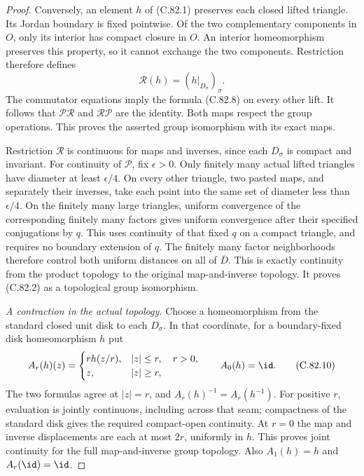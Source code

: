 \begin{proof}
Conversely, an element $h$ of (C.82.1)
preserves each closed lifted triangle.
Its Jordan boundary is fixed pointwise.
Of the two complementary components
in $O$, only its interior has compact
closure in $O$. An interior homeomorphism
preserves this property, so it cannot
exchange the two components. Restriction
therefore defines
\[
 \mathcal R(h)=(h|_{D_\sigma})_\sigma.
                                                               \tag{C.82.9}
\]
The commutator equations imply the
formula (C.82.8) on every other lift.
It follows that $\mathcal P\mathcal R$
and $\mathcal R\mathcal P$ are the
identity. Both maps respect the group
operations. This proves the asserted
group isomorphism with its exact maps.

Restriction $\mathcal R$ is continuous
for maps and inverses, since each
$D_\sigma$ is compact and invariant.
For continuity of $\mathcal P$, fix
$\epsilon>0$. Only finitely many actual
lifted triangles have diameter at least
$\epsilon/4$. On every other triangle,
two pasted maps, and separately their
inverses, take each point into the same
set of diameter less than $\epsilon/4$.
On the finitely many large triangles,
uniform convergence of the corresponding
finitely many factors gives uniform
convergence after their specified
conjugations by $q$. This uses continuity
of that fixed $q$ on a compact triangle,
and requires no boundary extension of
$q$. The finitely many factor neighborhoods
therefore control both uniform distances
on all of $\overline D$. This is exactly
continuity from the product topology
to the original map-and-inverse topology.
It proves (C.82.2) as a topological
group isomorphism.

\emph{A contraction in the actual topology.}
Choose a homeomorphism from the standard
closed unit disk to each $D_\sigma$.
In that coordinate, for a boundary-fixed
disk homeomorphism $h$ put
\[
 A_r(h)(z)=
 \begin{cases}
      r h(z/r),&|z|\leq r,\quad r>0,\\
      z,&|z|\geq r,
 \end{cases}
 \qquad A_0(h)=\id.
                                                               \tag{C.82.10}
\]
The two formulas agree at $|z|=r$,
and $A_r(h)^{-1}=A_r(h^{-1})$.
For positive $r$, evaluation is jointly
continuous, including across that seam;
compactness of the standard disk gives
the required compact-open continuity.
At $r=0$ the map and inverse displacements
are each at most $2r$, uniformly in $h$.
This proves joint continuity for the
full map-and-inverse group topology.
Also $A_1(h)=h$ and $A_r(\id)=\id$.


\end{proof}
